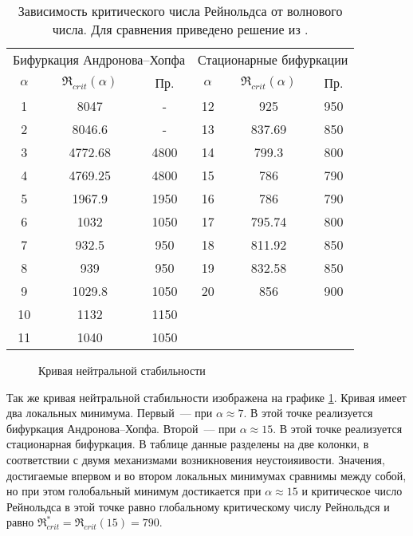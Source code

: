 \begin{table}[htp]
 \begin{tabular}{cccccc}
\hline
\hline
  \multicolumn{3}{c}{Бифуркация Андронова--Хопфа} & \multicolumn{3}{c}{Стационарные бифуркации} \\
  $\alpha$&	$\Re_{crit}(\alpha)$ \cite{lin-stability}&  Пр.&	$\alpha$&	$\Re_{crit}(\alpha)$ \cite{lin-stability}&  Пр. \\
\hline
  1&	8047&		-&	12&	925&		950\\ 
  2&	8046.6&		-&	13&	837.69&		850\\
  3&	4772.68&	4800&	14&	799.3&		800\\
  4&	4769.25&	4800&	15&	786&		790\\
  5&	1967.9&		1950&	16&	786&		790\\
  6&	1032&		1050&	17&	795.74&		800\\
  7&	932.5&		950&	18&	811.92&		850\\
  8&	939&		950&	19&	832.58&		850\\
  9&	1029.8&		1050&	20&	856&		900\\
  10&	1132&		1150\\
  11&	1040&		1050\\
\hline
 \end{tabular}
 \caption{Зависимость критического числа Рейнольдса от волнового числа. Для сравнения приведено решение из \cite{lin-stability}. }
 \label{Re_al}
\end{table}

\begin{figure}
  \center
  
  \caption{Кривая нейтральной стабильности}
  \label{graph:Re_al}
\end{figure}

Так же кривая нейтральной стабильности изображена на графике \ref{graph:Re_al}. Кривая имеет два локальных минимума. Первый~--- при $\alpha \approx 7 $. В этой точке реализуется бифуркация Андронова--Хопфа. Второй~--- при $\alpha \approx 15$. В этой точке реализуется стационарная бифуркация. В таблице данные разделены на две колонки, в соответствии с двумя механизмами возникновения неустоияивости.  Значения, достигаемые впервом и во втором локальных минимумах сравнимы между собой, но при этом голобальный минимум достикается при $\alpha \approx 15$ и критическое число Рейнольдса в этой точке равно глобальному критическому числу Рейнольдся и равно $\Re_{crit}^* = \Re_{crit}(15) = 790$. 

